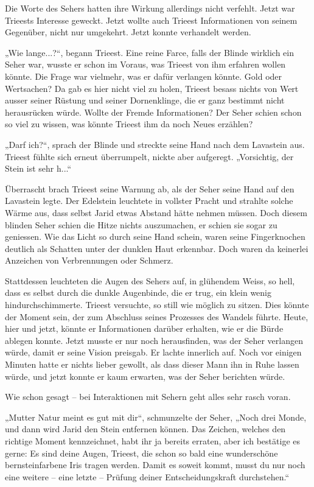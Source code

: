 \documentclass[10pt, a4paper, oneside]{book}
\begin{document}
Die Worte des Sehers hatten ihre Wirkung allerdings nicht verfehlt. Jetzt war Trieests Interesse geweckt. Jetzt wollte auch Trieest Informationen von seinem Gegenüber, nicht nur umgekehrt. Jetzt konnte verhandelt werden.\bigskip



„Wie lange...?“, begann Trieest. Eine reine Farce, falls der Blinde wirklich ein Seher war, wusste er schon im Voraus, was Trieest von ihm erfahren wollen könnte. Die Frage war vielmehr, was er dafür verlangen könnte. Gold oder Wertsachen? Da gab es hier nicht viel zu holen, Trieest besass nichts von Wert ausser seiner Rüstung und seiner Dornenklinge, die er ganz bestimmt nicht herausrücken würde. Wollte der Fremde Informationen? Der Seher schien schon so viel zu wissen, was könnte Trieest ihm da noch Neues erzählen?

„Darf ich?“, sprach der Blinde und streckte seine Hand nach dem Lavastein aus. Trieest fühlte sich erneut überrumpelt, nickte aber aufgeregt. „Vorsichtig, der Stein ist sehr h...“

Überrascht brach Trieest seine Warnung ab, als der Seher seine Hand auf den Lavastein legte. Der Edelstein leuchtete in vollster Pracht und strahlte solche Wärme aus, dass selbst Jarid etwas Abstand hätte nehmen müssen. Doch diesem blinden Seher schien die Hitze nichts auszumachen, er schien sie sogar zu geniessen. Wie das Licht so durch seine Hand schein, waren seine Fingerknochen deutlich als Schatten unter der dunklen Haut erkennbar. Doch waren da keinerlei Anzeichen von Verbrennungen oder Schmerz.

Stattdessen leuchteten die Augen des Sehers auf, in glühendem Weiss, so hell, dass es selbst durch die dunkle Augenbinde, die er trug, ein klein wenig hindurchschimmerte. Trieest versuchte, so still wie möglich zu sitzen. Dies könnte der Moment sein, der zum Abschluss seines Prozesses des Wandels führte. Heute, hier und jetzt, könnte er Informationen darüber erhalten, wie er die Bürde ablegen konnte. Jetzt musste er nur noch herausfinden, was der Seher verlangen würde, damit er seine Vision preisgab. Er lachte innerlich auf. Noch vor einigen Minuten hatte er nichts lieber gewollt, als dass dieser Mann ihn in Ruhe lassen würde, und jetzt konnte er kaum erwarten, was der Seher berichten würde.

Wie schon gesagt – bei Interaktionen mit Sehern geht alles sehr rasch voran.\bigskip



„Mutter Natur meint es gut mit dir“, schmunzelte der Seher, „Noch drei Monde, und dann wird Jarid den Stein entfernen können. Das Zeichen, welches den richtige Moment kennzeichnet, habt ihr ja bereits erraten, aber ich bestätige es gerne: Es sind deine Augen, Trieest, die schon so bald eine wunderschöne bernsteinfarbene Iris tragen werden. Damit es soweit kommt, musst du nur noch eine weitere – eine letzte – Prüfung deiner Entscheidungskraft durchstehen.“
\end{document}
